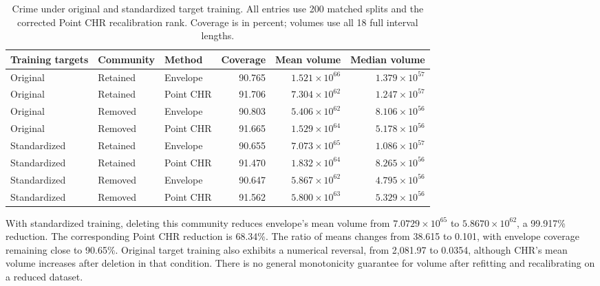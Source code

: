 \documentclass[11pt,letterpaper]{article}
\begin{document}
\begin{table}[htbp]
\centering\small
\caption{Crime under original and standardized target training. All entries
use 200 matched splits and the corrected Point CHR recalibration rank.
Coverage is in percent; volumes use all 18 full interval lengths.}
\label{tab:crime}
\begin{tabular}{lllrrr}
\toprule
Training targets & Community & Method & Coverage & Mean volume & Median volume\\
\midrule
Original & Retained & Envelope & 90.765 & $1.521\times 10^{66}$ & $1.379\times 10^{57}$ \\
Original & Retained & Point CHR & 91.706 & $7.304\times 10^{62}$ & $1.247\times 10^{57}$ \\
Original & Removed & Envelope & 90.803 & $5.406\times 10^{62}$ & $8.106\times 10^{56}$ \\
Original & Removed & Point CHR & 91.665 & $1.529\times 10^{64}$ & $5.178\times 10^{56}$ \\
\addlinespace
Standardized & Retained & Envelope & 90.655 & $7.073\times 10^{65}$ & $1.086\times 10^{57}$ \\
Standardized & Retained & Point CHR & 91.470 & $1.832\times 10^{64}$ & $8.265\times 10^{56}$ \\
Standardized & Removed & Envelope & 90.647 & $5.867\times 10^{62}$ & $4.795\times 10^{56}$ \\
Standardized & Removed & Point CHR & 91.562 & $5.800\times 10^{63}$ & $5.329\times 10^{56}$ \\
\bottomrule
\end{tabular}
\end{table}

With standardized training, deleting this community reduces envelope's mean
volume from $7.0729\times10^{65}$ to $5.8670\times10^{62}$, a 99.917\% reduction.
The corresponding Point CHR reduction is 68.34\%. The ratio of means changes
from 38.615 to 0.101, with envelope coverage remaining close to 90.65\%.
Original target training also exhibits a numerical reversal, from 2,081.97
to 0.0354, although CHR's mean volume increases after deletion in that condition.
There is no general monotonicity guarantee for volume after refitting and
recalibrating on a reduced dataset.
\end{document}

